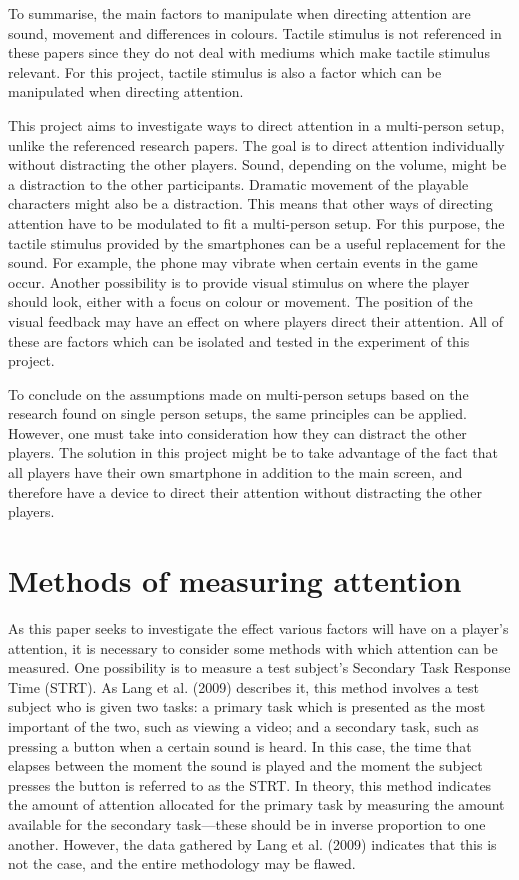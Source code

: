 To summarise, the main factors to manipulate when directing attention are sound, movement and differences in colours. Tactile stimulus is not referenced in these papers since they do not deal with mediums which make tactile stimulus relevant. For this project, tactile stimulus is also a factor which can be manipulated when directing attention. 

This project aims to investigate ways to direct attention in a multi-person setup, unlike the referenced research papers. The goal is to direct attention individually without distracting the other players. Sound, depending on the volume, might be a distraction to the other participants. Dramatic movement of the playable characters might also be a distraction. This means that other ways of directing attention have to be modulated to fit a multi-person setup. For this purpose, the tactile stimulus provided by the smartphones can be a useful replacement for the sound. For example, the phone may vibrate when certain events in the game occur. Another possibility is to provide visual stimulus on where the player should look, either with a focus on colour or movement. The position of the visual feedback may have an effect on where players direct their attention. All of these are factors which can be isolated and tested in the experiment of this project.

To conclude on the assumptions made on multi-person setups based on the research found on single person setups, the same principles can be applied. However, one must take into consideration how they can distract the other players. The solution in this project might be to take advantage of the fact that all players have their own smartphone in addition to the main screen, and therefore have a device to direct their attention without distracting the other players.

\section{Methods of measuring attention}\label{sec:measurement}
As this paper seeks to investigate the effect various factors will have on a player’s attention, it is necessary to consider some methods with which attention can be measured. One possibility is to measure a test subject’s Secondary Task Response Time (STRT). As Lang et al. (2009) \cite{Lang2009} describes it, this method involves a test subject who is given two tasks: a primary task which is presented as the most important of the two, such as viewing a video; and a secondary task, such as pressing a button when a certain sound is heard. In this case, the time that elapses between the moment the sound is played and the moment the subject presses the button is referred to as the STRT. In theory, this method indicates the amount of attention allocated for the primary task by measuring the amount available for the secondary task---these should be in inverse proportion to one another. However, the data gathered by Lang et al. (2009) \cite{Lang2009} indicates that this is not the case, and the entire methodology may be flawed.

